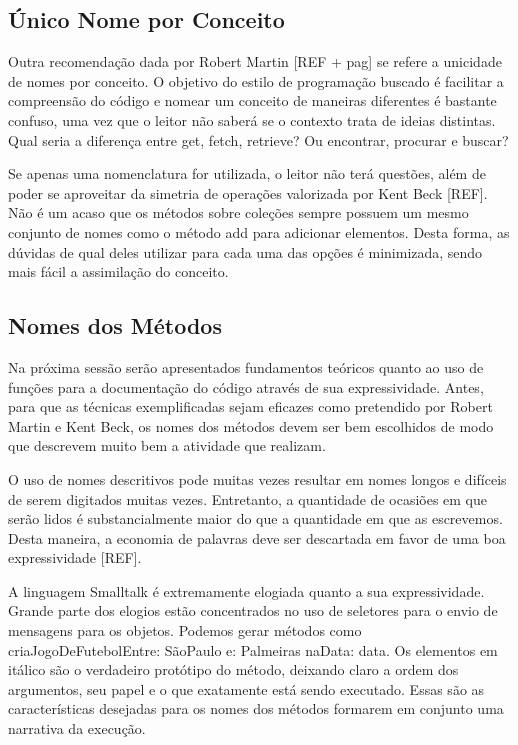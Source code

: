 


\subsection{Único Nome por Conceito}
Outra recomendação dada por Robert Martin [REF + pag] se refere a unicidade de nomes por conceito. O objetivo do estilo de programação buscado é facilitar a compreensão do código e nomear um conceito de maneiras diferentes é bastante confuso, uma vez que o leitor não saberá se o contexto trata de ideias distintas. Qual seria a diferença entre get, fetch, retrieve? Ou encontrar, procurar e buscar?
	
Se apenas uma nomenclatura for utilizada, o leitor não terá questões, além de poder se aproveitar da simetria de operações valorizada por Kent Beck [REF]. Não é um acaso que os métodos sobre coleções sempre possuem um mesmo conjunto de nomes como o método add para adicionar elementos. Desta forma, as dúvidas de qual deles utilizar para cada uma das opções é minimizada, sendo mais fácil a assimilação do conceito.

\subsection{Nomes dos Métodos}
Na próxima sessão serão apresentados fundamentos teóricos quanto ao uso de funções para a documentação do código através de sua expressividade. Antes, para que as técnicas exemplificadas sejam eficazes como pretendido por Robert Martin e Kent Beck, os nomes dos métodos devem ser bem escolhidos de modo que descrevem muito bem a atividade que realizam.
	
O uso de nomes descritivos pode muitas vezes resultar em nomes longos e difíceis de serem digitados muitas vezes. Entretanto, a quantidade de ocasiões em que serão lidos é substancialmente maior do que a quantidade em que as escrevemos. Desta maneira, a economia de palavras deve ser descartada em favor de uma boa expressividade [REF].
	
A linguagem Smalltalk é extremamente elogiada quanto a sua expressividade. Grande parte dos elogios estão concentrados no uso de seletores para o envio de mensagens para os objetos. Podemos gerar métodos como criaJogoDeFutebolEntre: SãoPaulo e: Palmeiras naData: data. Os elementos em itálico são o verdadeiro protótipo do método, deixando claro a ordem dos argumentos, seu papel e o que exatamente está sendo executado. Essas são as características desejadas para os nomes dos métodos formarem em conjunto uma narrativa da execução.

